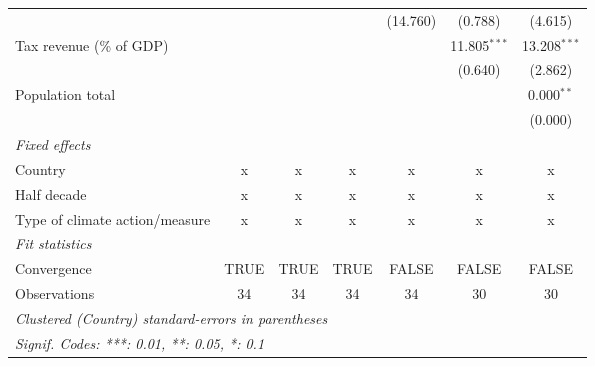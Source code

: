 \begin{tabular}{lcccccc}
                                                 &              &                &              & (14.760)  & (0.788)         & (4.615)\\   
   Tax revenue (\% of GDP)                       &              &                &              &           & 11.805$^{***}$  & 13.208$^{***}$\\   
                                                 &              &                &              &           & (0.640)         & (2.862)\\   
   Population total                              &              &                &              &           &                 & 0.000$^{**}$\\   
                                                 &              &                &              &           &                 & (0.000)\\   
   \emph{Fixed effects}\\
   Country                                       & x            & x              & x            & x         & x               & x\\  
   Half decade                                   & x            & x              & x            & x         & x               & x\\  
   Type of climate action/measure                & x            & x              & x            & x         & x               & x\\  
   \midrule \emph{Fit statistics}\\
   Convergence                                   &TRUE          & TRUE           & TRUE         & FALSE     & FALSE           & FALSE\\  
   Observations                                  & 34           & 34             & 34           & 34        & 30              & 30\\  
   \midrule
   \multicolumn{7}{l}{\emph{Clustered (Country) standard-errors in parentheses}}\\
   \multicolumn{7}{l}{\emph{Signif. Codes: ***: 0.01, **: 0.05, *: 0.1}}\\
\end{tabular}
\par\endgroup


